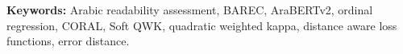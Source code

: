 \documentclass[12pt]{report}
\begin{document}
{\textbf{Keywords:}} Arabic readability assessment, BAREC, AraBERTv2, ordinal regression, CORAL, Soft QWK, quadratic weighted kappa, distance aware loss functions, error distance.




\tableofcontents

















\end{document}
